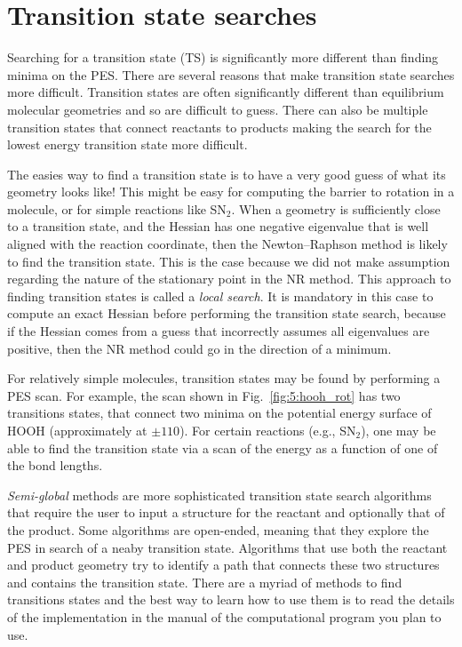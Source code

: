 \documentclass[../Main/notes.tex]{subfiles}
\begin{document}
\section{Transition state searches}

Searching for a transition state (TS) is significantly more different than finding minima on the PES.
There are several reasons that make transition state searches more difficult. Transition states are often significantly different than equilibrium molecular geometries and so are difficult to guess. There can also be multiple transition states that connect reactants to products making the search for the lowest energy transition state more difficult.

The easies way to find a transition state is to have a very good guess of what its geometry looks like!
This might be easy for computing the barrier to rotation in a molecule, or for simple reactions like SN$_2$.
When a geometry is sufficiently close to a transition state, and the Hessian has one negative eigenvalue that is well aligned with the reaction coordinate, then the Newton--Raphson method is likely to find the transition state.
This is the case because we did not make assumption regarding the nature of the stationary point in the NR method.
This approach to finding transition states is called a \emph{local search}.
It is mandatory in this case to compute an exact Hessian before performing the transition state search, because if the Hessian comes from a guess that incorrectly assumes all eigenvalues are positive, then the NR method could go in the direction of a minimum.

For relatively simple molecules, transition states may be found by performing a PES scan.
For example, the scan shown in Fig.~\ref{fig:5:hooh_rot} has two transitions states, that connect two minima on the potential energy surface of HOOH (approximately at $\pm 110$\textdegree).
For certain reactions (e.g., SN$_2$), one may be able to find the transition state via a scan of the energy as a function of one of the bond lengths.

\emph{Semi-global} methods are more sophisticated transition state search algorithms that require the user to input a structure for the reactant and optionally that of the product.
Some algorithms are open-ended, meaning that they explore the PES in search of a neaby transition state.
Algorithms that use both the reactant and product geometry try to identify a path that connects these two structures and contains the transition state.
There are a myriad of methods to find transitions states and the best way to learn how to use them is to read the details of the implementation in the manual of the computational program you plan to use.
\end{document}
